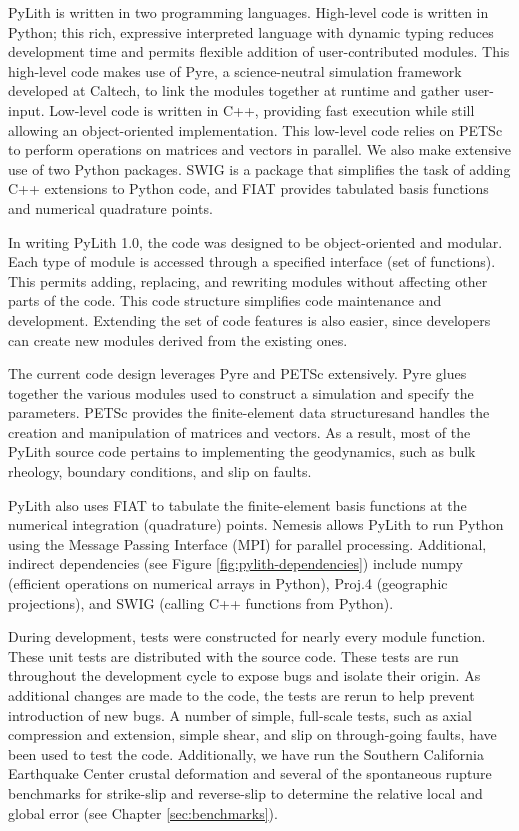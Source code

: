 PyLith is written in two programming languages. High-level code is
written in Python; this rich, expressive interpreted language with
dynamic typing reduces development time and permits flexible addition
of user-contributed modules. This high-level code makes use of Pyre, a
science-neutral simulation framework developed at Caltech, to link the
modules together at runtime and gather user-input. Low-level code is
written in C++, providing fast execution while still allowing an
object-oriented implementation. This low-level code relies on PETSc to
perform operations on matrices and vectors in parallel. We also make
extensive use of two Python packages. SWIG is a package that
simplifies the task of adding C++ extensions to Python code, and FIAT
provides tabulated basis functions and numerical quadrature points.

In writing PyLith 1.0, the code was designed to be object-oriented and
modular. Each type of module is accessed through a specified interface
(set of functions). This permits adding, replacing, and rewriting
modules without affecting other parts of the code. This code structure
simplifies code maintenance and development. Extending the set of code
features is also easier, since developers can create new modules
derived from the existing ones.

The current code design leverages Pyre and PETSc extensively. Pyre
glues together the various modules used to construct a simulation and
specify the parameters. PETSc provides the finite-element data
structuresand handles the creation and manipulation of matrices and
vectors. As a result, most of the PyLith source code pertains to
implementing the geodynamics, such as bulk rheology, boundary
conditions, and slip on faults.

PyLith also uses FIAT to tabulate the finite-element basis functions
at the numerical integration (quadrature) points. Nemesis allows
PyLith to run Python using the Message Passing Interface (MPI) for
parallel processing. Additional, indirect dependencies (see Figure
\vref{fig:pylith-dependencies}) include numpy (efficient operations on
numerical arrays in Python), Proj.4 (geographic projections), and SWIG
(calling C++ functions from Python).

During development, tests were constructed for nearly every module
function. These unit tests are distributed with the source code. These
tests are run throughout the development cycle to expose bugs and
isolate their origin. As additional changes are made to the code, the
tests are rerun to help prevent introduction of new bugs. A number of
simple, full-scale tests, such as axial compression and extension,
simple shear, and slip on through-going faults, have been used to test
the code. Additionally, we have run the Southern California Earthquake
Center crustal deformation and several of the spontaneous rupture
benchmarks for strike-slip and reverse-slip to determine the relative
local and global error (see Chapter \vref{sec:benchmarks}).

